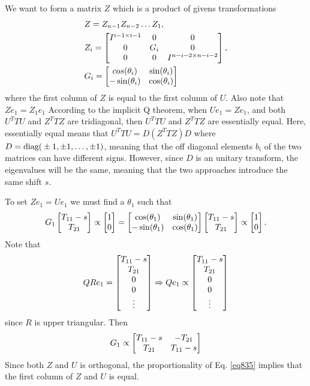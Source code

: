 We want to form a matrix $Z$ which is a product of givens transformations
\begin{align}
	&Z = Z_{n-1}Z_{n-2}\dots Z_{1}, \notag\\ 
	&Z_i = 
		\left[\begin{matrix}  
				I^{i-1\times i-1} 	& 0 	& 0 \\ 
				0 					& G_i 	& 0 \\ 
				0 					& 0 	& I^{n-i-2\times n-i-2} \end{matrix}\right], \notag\\
	&G_i = \left[\begin{matrix} cos(\theta_i) & \sin(\theta_i) \\ -\sin(\theta_i) & \cos(\theta_i) \end{matrix}\right]
\end{align}
where the first column of $Z$ is equal to the first column of $U$.
Also note that $Ze_1 = Z_1e_1$
According to the implicit Q theorem, when $Ue_1=Ze_1$, and both $U^TTU$ and $Z^TTZ$ are
tridiagonal, then $U^TTU$ and $Z^TTZ$ are essentially equal. Here, essentially equal means that
$U^TTU = D(Z^TTZ)D$ where $D = \text{diag}{(}\pm1,\pm1,\dots,\pm1)$, meaning that the off diagonal 
elements $b_i$ of the two matrices can have different signs. 
However, since $D$ is an unitary transform, the eigenvalues will be the same, meaning 
that the two approaches introduce the same shift $s$.

To set $Ze_1=Ue_1$ we must find a $\theta_1$ such that
\begin{equation}
	G_1 
	\left[\begin{matrix}  T_{11}-s \\ T_{21}  \end{matrix}\right] \propto \left[\begin{matrix}  1 \\ 0 \end{matrix}\right] = 
	\left[\begin{matrix}  \cos(\theta_1) & \sin(\theta_1) \\ -\sin(\theta_1) & \cos(\theta_1)  \end{matrix}\right] 
	\left[\begin{matrix}  T_{11}-s \\ T_{21}  \end{matrix}\right] \propto \left[\begin{matrix}  1 \\ 0 \end{matrix}\right] \label{eq835}. 
\end{equation}
Note that 
\begin{equation}
	QRe_1 = \left[\begin{matrix} T_{11}-s\\T_{21}\\0\\0\\ \vdots \end{matrix}\right] 
	\Rightarrow Qe_1 \propto  \left[\begin{matrix} T_{11}-s\\T_{21} \\0\\0\\ \vdots \end{matrix}\right]
\end{equation}
since $R$ is upper triangular. Then
\begin{equation}
	G_1 \propto  \left[\begin{matrix} T_{11}-s & -T_{21} \\ T_{21} & T_{11}-s \end{matrix}\right]
\end{equation}
Since both $Z$ and $U$ is orthogonal, the proportionality of Eq. \eqref{eq835} implies that 
the first column of $Z$ and $U$ is equal.

